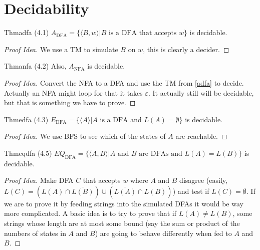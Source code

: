 \chapter{Decidability}

\begin{reference}{Thm}{adfa}
  (4.1) $A_{\mathrm{DFA}}=\{\langle B, w\rangle|B\text{ is a DFA that accepts }w\}$ is decidable.
\end{reference}

\begin{proof}[Proof Idea]
  We use a TM to simulate $B$ on $w$, this is clearly a decider.
\end{proof}

\begin{reference}{Thm}{anfa}
  (4.2) Also, $A_{\mathrm{NFA}}$ is decidable.
\end{reference}

\begin{proof}[Proof Idea]
  Convert the NFA to a DFA and use the TM from \ref{adfa} to decide. Actually an NFA might loop for that it takes $\varepsilon$. It actually still will be decidable, but that is something we have to prove.
\end{proof}

\begin{reference}{Thm}{edfa}
  (4.3) $E_{\mathrm{DFA}}=\{\langle A\rangle|A\text{ is a DFA and }L(A)=\emptyset\}$ is decidable.
\end{reference}

\begin{proof}[Proof Idea]
  We use BFS to see which of the states of $A$ are reachable.
\end{proof}

\begin{reference}{Thm}{eqdfa}
  (4.5) $EQ_{\mathrm{DFA}}=\{\langle A,B\rangle|A\text{ and }B\text{ are DFAs and }L(A)=L(B)\}$ is decidable.
\end{reference}

\begin{proof}[Proof Idea]
  Make DFA $C$ that accepts $w$ where $A$ and $B$ disagree (easily, $L(C)=(L(A)\cap \overline{L(B)})\cup(\overline{L(A)}\cap L(B))$) and test if $L(C)=\emptyset$. If we are to prove it by feeding strings into the simulated DFAs it would be way more complicated. A basic idea is to try to prove that if $L(A)\neq L(B)$, some strings whose length are at most some bound (say the sum or product of the numbers of states in $A$ and $B$) are going to behave differently when fed to $A$ and $B$.
\end{proof}

